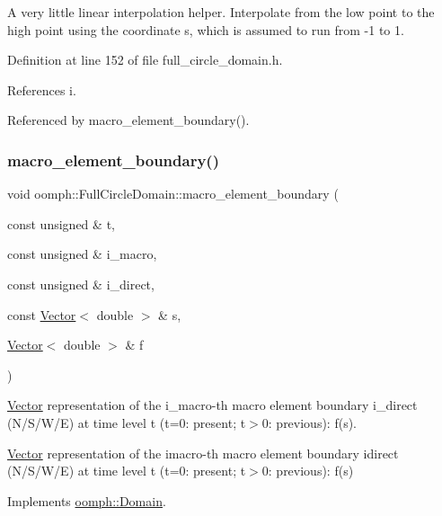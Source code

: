 A very little linear interpolation helper. Interpolate from the low point to the high point using the coordinate s, which is assumed to run from -\/1 to 1. 



Definition at line 152 of file full\+\_\+circle\+\_\+domain.\+h.



References i.



Referenced by macro\+\_\+element\+\_\+boundary().

\mbox{\label{classoomph_1_1FullCircleDomain_a93253d6c878c3ab40a582e0d2070a69d}} 
\subsubsection{\texorpdfstring{macro\+\_\+element\+\_\+boundary()}{macro\_element\_boundary()}}
{\footnotesize\ttfamily void oomph\+::\+Full\+Circle\+Domain\+::macro\+\_\+element\+\_\+boundary (\begin{DoxyParamCaption}\item[{const unsigned \&}]{t,  }\item[{const unsigned \&}]{i\+\_\+macro,  }\item[{const unsigned \&}]{i\+\_\+direct,  }\item[{const \hyperlink{classoomph_1_1Vector}{Vector}$<$ double $>$ \&}]{s,  }\item[{\hyperlink{classoomph_1_1Vector}{Vector}$<$ double $>$ \&}]{f }\end{DoxyParamCaption})\hspace{0.3cm}{\ttfamily [virtual]}}



\hyperlink{classoomph_1_1Vector}{Vector} representation of the i\+\_\+macro-\/th macro element boundary i\+\_\+direct (N/\+S/\+W/E) at time level t (t=0\+: present; t$>$0\+: previous)\+: f(s). 

\hyperlink{classoomph_1_1Vector}{Vector} representation of the imacro-\/th macro element boundary idirect (N/\+S/\+W/E) at time level t (t=0\+: present; t$>$0\+: previous)\+: f(s) 

Implements \hyperlink{classoomph_1_1Domain_a95f3e00d28ea37e6c4d3027bfac91096}{oomph\+::\+Domain}.



